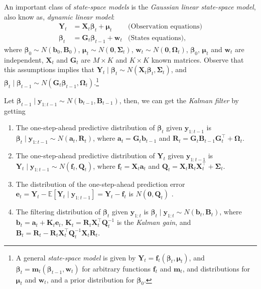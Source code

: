 An important class of \textit{state-space models} is the \textit{Gaussian linear state-space model}, also know as, \textit{dynamic linear model}:
\begin{align*}
	\bm{Y}_t&=\bm{X}_t\bm{\beta}_t+\bm{\mu}_t& \text{(Observation equations)}\\
	\bm{\beta}_t&=\bm{G}_t\bm{\beta}_{t-1}+\bm{w}_t & \text{(States equations)},
\end{align*}
where $\bm{\beta}_0\sim N(\bm{b}_0,\bm{B}_0)$, $\bm{\mu}_t\sim N(\bm{0}, \bm{\Sigma}_t)$, $\bm{w}_t\sim N(\bm{0}, \bm{\Omega}_t)$, $\bm{\beta}_0$, $\bm{\mu}_t$ and $\bm{w}_t$ are independent, $\bm{X}_t$ and $\bm{G}_t$ are $M\times K$ and $K\times K$ known matrices. Observe that this assumptions implies that $\bm{Y}_t\mid \bm{\beta}_t\sim N(\bm{X}_t\bm{\beta}_t,\bm{\Sigma}_t)$, and $\bm{\beta}_t\mid \bm{\beta}_{t-1}\sim N(\bm{G}_t\bm{\beta}_{t-1},\bm{\Omega}_t)$.\footnote{A general \textit{state-space model} is given by $\bm{Y}_t=\bm{f}_t(\bm{\beta}_t,\bm{\mu}_t)$, and $\bm{\beta}_t=\bm{m}_t(\bm{\beta}_{t-1},\bm{w}_t)$ for arbitrary functions $\bm{f}_t$ and $\bm{m}_t$, and distributions for $\bm{\mu}_t$ and $\bm{w}_t$, and a prior distribution for $\bm{\beta}_0$.}

Let $\bm{\beta}_{t-1}\mid \bm{y}_{1:t-1}\sim N(\bm{b}_{t-1},\bm{B}_{t-1})$, then, we can get the \textit{Kalman filter} by getting
\begin{enumerate}
	\item The one-step-ahead predictive distribution of $\bm{\beta}_t$ given $\bm{y}_{1:t-1}$ is $\bm{\beta}_t\mid \bm{y}_{1:t-1}\sim N(\bm{a}_t, \bm{R}_t)$, where $\bm{a}_t=\bm{G}_t\bm{b}_{t-1}$ and $\bm{R}_t=\bm{G}_t\bm{B}_{t-1}\bm{G}_t^{\top}+\bm{\Omega}_t$.
	\item  The one-step-ahead predictive distribution of $\bm{Y}_t$ given $\bm{y}_{1:t-1}$ is $\bm{Y}_t\mid \bm{y}_{1:t-1}\sim N(\bm{f}_t, \bm{Q}_t)$, where $\bm{f}_t=\bm{X}_t\bm{a}_t$ and $\bm{Q}_t=\bm{X}_t\bm{R}_t\bm{X}_t^{\top}+\bm{\Sigma}_t$.
	\item The distribution of the one-step-ahead prediction error  $\bm{e}_t=\bm{Y}_t-\mathbb{E}[\bm{Y}_t\mid \bm{y}_{1:t-1}]=\bm{Y}_t-\bm{f}_t$ is $N(\bm{0}, \bm{Q}_t)$ \cite[Chap.~6]{shumway2017time}. 
	\item The filtering distribution of $\bm{\beta}_t$ given $\bm{y}_{1:t}$ is $\bm{\beta}_t\mid \bm{y}_{1:t}\sim N(\bm{b}_t, \bm{B}_t)$, where $\bm{b}_t=\bm{a}_t+\bm{K}_t\bm{e}_t$, $\bm{K}_t=\bm{R}_t\bm{X}_t^{\top}\bm{Q}_t^{-1}$ is the \textit{Kalman gain}, and $\bm{B}_t=\bm{R}_t-\bm{R}_t\bm{X}_t^{\top}\bm{Q}_t^{-1}\bm{X}_t\bm{R}_t$.   
\end{enumerate}    

